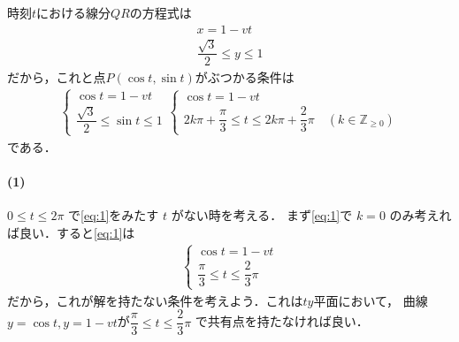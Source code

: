 \documentclass[../../main.tex]{subfiles}
\begin{document}
時刻$t$における線分$QR$の方程式は
\begin{align}
  x = 1 - vt \\
  \dfrac{\sqrt{3}}{2} \le y \le 1
\end{align}
だから，これと点$P(\cos t,\sin t)$がぶつかる条件は
\begin{align}
  \begin{cases}
    \cos t = 1 - vt \\
    \dfrac{\sqrt{3}}{2} \le \sin t \le 1
  \end{cases}
  \begin{cases}
    \cos t = 1 - vt \\
    2k\pi + \dfrac{\pi}{3} \le t \le 2k\pi + \dfrac{2}{3}\pi \quad (k\in \mathbb{Z}_{\ge 0})
  \end{cases} \label{eq:1}
\end{align}
である．

\paragraph{(1)}

$0 \le t \le 2\pi$ で\cref{eq:1}をみたす $t$ がない時を考える．
まず\cref{eq:1}で $k=0$ のみ考えれば良い．すると\cref{eq:1}は
\begin{align}
  \begin{cases}
    \cos t = 1 - vt \\
    \dfrac{\pi}{3} \le t \le \dfrac{2}{3}\pi
  \end{cases} \label{eq:2}
\end{align}
だから，これが解を持たない条件を考えよう．これは$ty$平面において，
曲線$y=\cos t, y=1-vt$が$\dfrac{\pi}{3} \le t \le \dfrac{2}{3}\pi$
で共有点を持たなければ良い．
\end{document}
